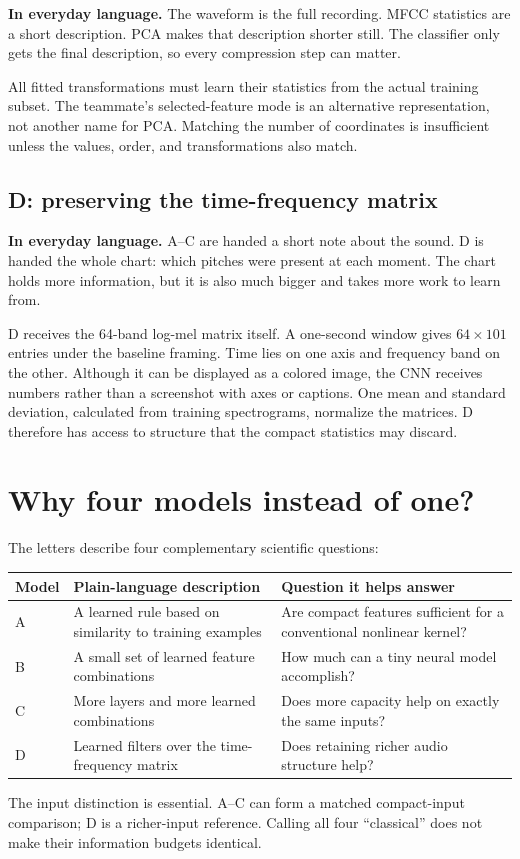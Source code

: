 \documentclass[11pt,letterpaper]{article}
\newcommand{\plain}[1]{\par\smallskip\noindent\textbf{In everyday language.} #1\par\smallskip}
\begin{document}
\plain{The waveform is the full recording. MFCC statistics are a short
description. PCA makes that description shorter still. The classifier only
gets the final description, so every compression step can matter.}

All fitted transformations must learn their statistics from the actual training
subset. The teammate's selected-feature mode is an alternative representation,
not another name for PCA. Matching the number of coordinates is insufficient
unless the values, order, and transformations also match.

\subsection{D: preserving the time-frequency matrix}
\plain{A--C are handed a short note about the sound. D is handed the whole
chart: which pitches were present at each moment. The chart holds more
information, but it is also much bigger and takes more work to learn from.}

D receives the 64-band log-mel matrix itself. A one-second window gives
$64\times101$ entries under the baseline framing. Time lies on one axis and
frequency band on the other. Although it can be displayed as a colored image,
the CNN receives numbers rather than a screenshot with axes or captions.
One mean and standard deviation, calculated from training spectrograms,
normalize the matrices. D therefore has access to structure that the compact
statistics may discard.

\section{Why four models instead of one?}
\label{sec:fourmodels}
The letters describe four complementary scientific questions:
\begin{center}
\begin{tabularx}{\linewidth}{@{}lYY@{}}
\toprule
Model & Plain-language description & Question it helps answer \\
\midrule
A & A learned rule based on similarity to training examples & Are compact
features sufficient for a conventional nonlinear kernel? \\
B & A small set of learned feature combinations & How much can a tiny
neural model accomplish? \\
C & More layers and more learned combinations & Does more capacity help
on exactly the same inputs? \\
D & Learned filters over the time-frequency matrix & Does retaining
richer audio structure help? \\
\bottomrule
\end{tabularx}
\end{center}
The input distinction is essential. A--C can form a matched compact-input
comparison; D is a richer-input reference. Calling all four ``classical'' does
not make their information budgets identical.
\end{document}
